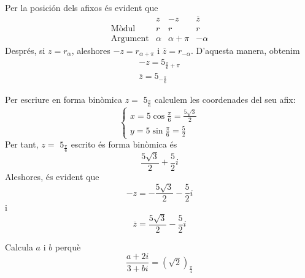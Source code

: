 \begin{solucio}
Per la posición dels afixos és evident que
\begin{equation*}
\begin{array}{llll}
& z & -z & \overline{z} \\
\text{Mòdul} & r & r & r \\
\text{Argument} & \alpha & \alpha +\pi & -\alpha
\end{array}
\end{equation*}
Després, si $z=r_{\alpha }$, aleshores $-z=r_{\alpha +\pi }$ i $\overline{z}
=r_{-\alpha }$. D’aquesta manera, obtenim
\begin{equation*}
\begin{array}{l}
-z=5_{\frac{\pi }{6}+\pi } \\
\overline{z}=5_{-\frac{\pi }{6}}
\end{array}
\end{equation*}

Per escriure en forma binòmica $z=$ $5_{\frac{\pi }{6}}$ calculem les
coordenades del seu afix:
\begin{equation*}
\left\{
\begin{array}{l}
x=5\cos \frac{\pi }{6}=\frac{5\sqrt{3}}{2} \\
y=5\sin \frac{\pi }{6}=\frac{5}{2}
\end{array}
\right.
\end{equation*}
Per tant, $z=$ $5_{\frac{\pi }{6}}$ escrito és forma binòmica és
\begin{equation*}
\frac{5\sqrt{3}}{2}+\frac{5}{2}i
\end{equation*}
Aleshores, és evident que
\begin{equation*}
-z=-\frac{5\sqrt{3}}{2}-\frac{5}{2}i
\end{equation*}
i
\begin{equation*}
\overline{z}=\frac{5\sqrt{3}}{2}-\frac{5}{2}i
\end{equation*}
\end{solucio}

\begin{exemple}
Calcula $a$ i $b$ perquè
\begin{equation*}
\frac{a+2i}{3+bi}=\left( \sqrt{2}\right) _{\frac{\pi }{4}}
\end{equation*}
\end{exemple}

